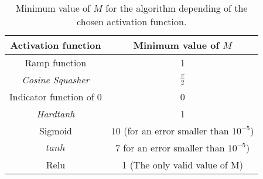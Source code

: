\begin{table}[h]
    \centering
    \begin{tabular}{|c|c|}
    \hline
        \textbf{Activation function}  & \textbf{Minimum value of $M$} \\ \hline
        Ramp function & 1 \\ \hline
        \textit{Cosine Squasher} & $\frac{\pi}{2}$ \\ \hline
        Indicator function of 0 & 0 \\ \hline
        \textit{Hardtanh} & 1 \\ \hline
        Sigmoid  &  $10$ (for an error smaller than $10^{-5}$)\\ \hline
        $tanh$ &  $7$ for an error smaller than $10^{-5}$)\\ \hline
        Relu & 1 (The only valid value of M) \\ \hline
    \end{tabular}
    \caption{
        Minimum value of $M$ for the algorithm depending of the chosen activation function.
    }
    \label{table:M-activation-function}
\end{table}






